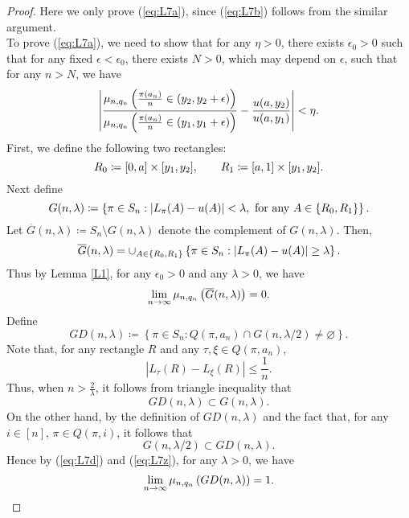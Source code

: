 \begin{proof}
Here we only prove (\ref{eq:L7a}), since (\ref{eq:L7b}) follows from the similar argument.\\
To prove (\ref{eq:L7a}), we need to show that for any $\eta >0$, there exists $\epsilon_0 >0$ such that for any fixed $\epsilon < \epsilon_0$, there exists $N>0$, which may depend on $\epsilon$, such that for any $n > N$, we have
\begin{equation}
\left| \frac{\mu_{n, q_n} \left( \frac{\pi(a_n)}{n} \in (y_2, y_2 + \epsilon) \right)}{\mu_{n, q_n} \left( \frac{\pi(a_n)}{n} \in (y_1, y_1 + \epsilon) \right)}
- \frac{u(a, y_2)}{u(a, y_1)} \right| < \eta  .  \label{eq:L7c}
\end{equation}
First, we define the following two rectangles:
\[
R_0 \coloneqq [0, a] \times [y_1, y_2], \qquad R_1 \coloneqq [a, 1] \times [y_1, y_2].\\
\]
Next define
\[
G(n, \lambda) \coloneqq \left\{ \pi \in S_n : \left| L_{\pi}(A) - u(A) \right| < \lambda, \text{ for any } A \in \{R_0, R_1\} \right\}.
\]
Let $\overline{G}(n, \lambda) \coloneqq S_n \setminus G(n, \lambda)$ denote the complement of $G(n, \lambda)$. Then,
\[
\overline{G}(n, \lambda) = \cup_{A \in \{R_0, R_1\}}
\left\{ \pi \in S_n : \left| L_{\pi}(A) - u(A) \right| \ge \lambda \right\}.
\]
Thus by Lemma \ref{L1}, for any $\epsilon_0 > 0$ and any $\lambda > 0$, we have
\begin{equation}
\lim_{n \to \infty} \mu_{n, q_n} \left( \overline{G}(n, \lambda) \right) = 0 . \label{eq:L7d}
\end{equation}
Define
\[
GD(n, \lambda) \coloneqq \left\{ \pi \in S_n : Q(\pi, a_n) \cap G(n, \lambda/2) \neq \varnothing \right\}.
\]
Note that, for any rectangle $R$ and any $\tau, \xi \in Q(\pi, a_n)$,
\[
|L_{\tau}(R) - L_{\xi}(R)| \le \frac{1}{n}.
\]
Thus, when $n > \frac{2}{\lambda}$, it follows from triangle inequality that
\begin{equation}
GD(n, \lambda) \subset G(n, \lambda).  \label{eq:L7e}
\end{equation}
On the other hand, by the definition of $GD(n, \lambda)$ and the fact that, for any $i \in [n]$,  $\pi \in Q(\pi, i)$, it follows that
\begin{equation}
G(n, \lambda/2) \subset GD(n, \lambda). \label{eq:L7z}
\end{equation}
Hence by (\ref{eq:L7d}) and (\ref{eq:L7z}), for any $\lambda > 0$, we have
\begin{equation}
\lim_{n \to \infty} \mu_{n, q_n} \left(GD(n, \lambda) \right) = 1 .  \label{eq:L7f}
\end{equation}

\end{proof}
